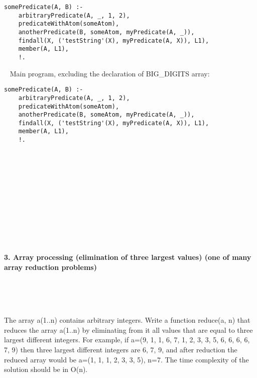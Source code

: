 \documentclass{article}
\begin{document}
	\begin{verbatim}
somePredicate(A, B) :-
    arbitraryPredicate(A, _, 1, 2),
    predicateWithAtom(someAtom),
    anotherPredicate(B, someAtom, myPredicate(A, _)),
    findall(X, ('testString'(X), myPredicate(A, X)), L1),
    member(A, L1),
    !.
	\end{verbatim}
	
	\rmfamily\
	\newline
	\noindent Main program, excluding the declaration of BIG_DIGITS array:
	
	\begin{verbatim}
somePredicate(A, B) :-
    arbitraryPredicate(A, _, 1, 2),
    predicateWithAtom(someAtom),
    anotherPredicate(B, someAtom, myPredicate(A, _)),
    findall(X, ('testString'(X), myPredicate(A, X)), L1),
    member(A, L1),
    !.
	\end{verbatim}
	

	
\paragraph{}\
\paragraph{}\
\paragraph{}\
\paragraph{}\
\paragraph{}\


	
	\rmfamily
	
	\paragraph{3. Array processing (elimination of three largest values) (one of many array reduction problems) }\
	
	\rmfamily\
	
		The array a(1..n) contains arbitrary integers. Write a function reduce(a, n) that reduces the array a(1..n) by eliminating from it all values that are equal to three largest different integers. For example, if a=(9, 1, 1, 6, 7, 1, 2, 3, 3, 5, 6, 6, 6, 6, 7, 9) then three largest different integers are 6, 7, 9, and after reduction the reduced array would be a=(1, 1, 1, 2, 3, 3, 5), n=7. The time complexity of the solution should be in O(n). 
		\newline
		
\end{document}
